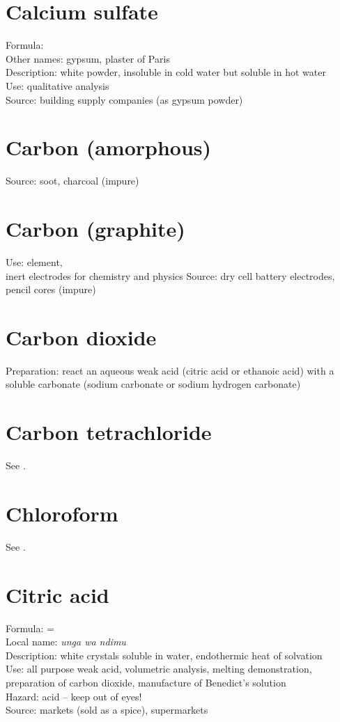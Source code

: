 \section{Calcium sulfate}
Formula: \\
Other names: gypsum, 
plaster of Paris\\
Description: white powder, 
insoluble in cold water but soluble in hot water\\
Use: qualitative analysis\\
Source: building supply companies (as gypsum powder)

\section{Carbon (amorphous)}
Source: soot, 
charcoal (impure)

\section{Carbon (graphite)}
\label{sec:carbongraphite}
Use: element, \\
inert electrodes for chemistry and physics
Source: dry cell battery electrodes, 
pencil cores (impure)

\section{Carbon dioxide}
Preparation: react an aqueous weak acid 
(citric acid or ethanoic acid) with a soluble carbonate 
(sodium carbonate or sodium hydrogen carbonate)

\section{Carbon tetrachloride}
See .

\section{Chloroform}
See .

\section{Citric acid}
Formula:  = \\
Local name: \textit{unga wa ndimu}\\
Description: white crystals soluble in water, 
endothermic heat of solvation\\
Use: all purpose weak acid, 
volumetric analysis, 
melting demonstration, 
preparation of carbon dioxide, 
manufacture of Benedict's solution\\
Hazard: acid – keep out of eyes!\\
Source: markets (sold as a spice), 
supermarkets

